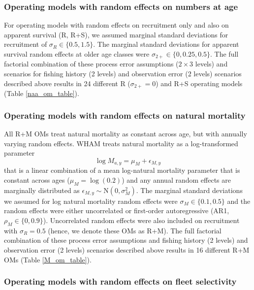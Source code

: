 \documentclass[
  12pt,
]{article}
\begin{document}
\subsubsection*{Operating models with random effects on numbers at
age}\label{operating-models-with-random-effects-on-numbers-at-age}

For operating models with random effects on recruitment only and also on
apparent survival (R, R+S), we assumed marginal standard deviations for
recruitment of \(\sigma_R \in \{0.5,1.5\}\). The marginal standard
deviations for apparent survival random effects at older age classes
were \(\sigma_{2+} \in \{0,0.25, 0.5\}\). The full factorial combination
of these process error assumptions (\(2\times 3\) levels) and scenarios
for fishing history (2 levels) and observation error (2 levels)
scenarios described above results in 24 different R
(\(\sigma_{2+} = 0\)) and R+S operating models (Table
\ref{naa_om_table}).

\subsubsection*{Operating models with random effects on natural
mortality}\label{operating-models-with-random-effects-on-natural-mortality}

All R+M OMs treat natural mortality as constant across age, but with
annually varying random effects. WHAM treats natural mortality as a
log-transformed parameter \[
\log M_{a,y} = \mu_{M} + \epsilon_{M,y}
\] that is a linear combination of a mean log-natural mortality
parameter that is constant across ages (\(\mu_{M} = \log(0.2)\)) and any
annual random effects are marginally distributed as
\(\epsilon_{M,y} \sim \text{N}\left(0,\sigma_M^2\right)\). The marginal
standard deviations we assumed for log natural mortality random effects
were \(\sigma_M \in \{0.1, 0.5\}\) and the random effects were either
uncorrelated or first-order autoregressive (AR1,
\(\rho_M \in \{0,0.9\}\)). Uncorrelated random effects were also
included on recruitment with \(\sigma_R = 0.5\) (hence, we denote these
OMs as R+M). The full factorial combination of these process error
assumptions and fishing history (2 levels) and observation error (2
levels) scenarios described above results in 16 different R+M OMs (Table
\ref{M_om_table}).

\subsubsection*{Operating models with random effects on fleet
selectivity}\label{operating-models-with-random-effects-on-fleet-selectivity}
\end{document}
